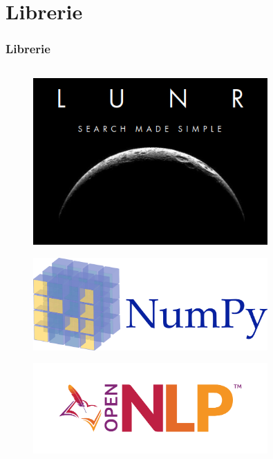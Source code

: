 \documentclass{beamer}
\begin{document}
	\section{Librerie}
\begin{frame}
	\frametitle{Librerie}
	\begin{columns}
		\begin{column}{0.5\textwidth}
			
		\end{column}
	\end{columns}
	\begin{columns}
		\begin{column}{0.33\textwidth}
			\begin{figure}
				\vspace{-1em}
				\centering
				\includegraphics[width=0.8\textwidth]{img/lunrjs.png}
			\end{figure}
			\begin{figure}
				\centering
				\includegraphics[width=0.8\textwidth]{img/numpy.png}
			\end{figure}
			\begin{figure}
				\centering
				\includegraphics[width=0.8\textwidth]{img/OpenNLP_Logo.pdf}

\end{figure}
\end{column}
\end{columns}
\end{frame}
\end{document}
